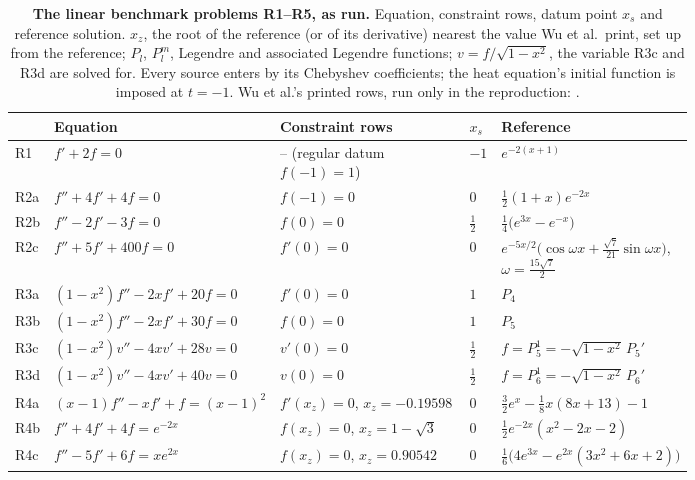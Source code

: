 \begin{table}[!htbp]
    \centering
    \caption[The linear benchmark problems R1--R5]{\textbf{The linear benchmark problems R1--R5, as run.} Equation, constraint rows, datum point $x_s$ and reference solution. $x_z$, the root of the reference (or of its derivative) nearest the value Wu et al.\ print, set up from the reference; $P_l$, $P_l^m$, Legendre and associated Legendre functions; $v=f/\sqrt{1-x^2}$, the variable R3c and R3d are solved for. Every source enters by its Chebyshev coefficients; the heat equation's initial function is imposed at $t=-1$. Wu et al.'s printed rows, run only in the reproduction: .}
    \label{tab:catalogue-linear}
    \footnotesize
    \begin{tabular}{@{}l p{0.26\linewidth} p{0.29\linewidth} l p{0.24\linewidth}@{}}
        \toprule
        & Equation & Constraint rows & $x_s$ & Reference \\
        \midrule
        R1  & $f' + 2f = 0$ & -- (regular datum $f(-1)=1$) & $-1$ & $e^{-2(x+1)}$ \\
        R2a & $f'' + 4f' + 4f = 0$ & $f(-1) = 0$ & $0$ & $\tfrac12(1+x)e^{-2x}$ \\
        R2b & $f'' - 2f' - 3f = 0$ & $f(0) = 0$ & $\tfrac12$ & $\tfrac14\bigl(e^{3x} - e^{-x}\bigr)$ \\
        R2c & $f'' + 5f' + 400f = 0$ & $f'(0) = 0$ & $0$ & $e^{-5x/2}\bigl(\cos\omega x + \tfrac{\sqrt7}{21}\sin\omega x\bigr)$, $\omega = \tfrac{15\sqrt7}{2}$ \\
        R3a & $(1-x^2)f'' - 2xf' + 20f = 0$ & $f'(0) = 0$ & $1$ & $P_4$ \\
        R3b & $(1-x^2)f'' - 2xf' + 30f = 0$ & $f(0) = 0$ & $1$ & $P_5$ \\
        R3c & $(1-x^2)v'' - 4xv' + 28v = 0$ & $v'(0) = 0$ & $\tfrac12$ & $f = P_5^1 = -\sqrt{1-x^2}\,P_5'$ \\
        R3d & $(1-x^2)v'' - 4xv' + 40v = 0$ & $v(0) = 0$ & $\tfrac12$ & $f = P_6^1 = -\sqrt{1-x^2}\,P_6'$ \\
        R4a & $(x-1)f'' - xf' + f = (x-1)^2$ & $f'(x_z) = 0$, $x_z = -0.19598$ & $0$ & $\tfrac32e^{x} - \tfrac18x(8x+13) - 1$ \\
        R4b & $f'' + 4f' + 4f = e^{-2x}$ & $f(x_z) = 0$, $x_z = 1-\sqrt3$ & $0$ & $\tfrac12e^{-2x}(x^2 - 2x - 2)$ \\
        R4c & $f'' - 5f' + 6f = xe^{2x}$ & $f(x_z) = 0$, $x_z = 0.90542$ & $0$ & $\tfrac16\bigl(4e^{3x} - e^{2x}(3x^2 + 6x + 2)\bigr)$ \\

\end{tabular}
\end{table}
